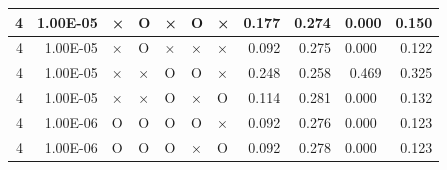 \documentclass[11pt]{article}
\begin{document}
\begin{longtable}[h]{|r|r|l|l|l|l|l|r|r|l|r|}
4                                 & 1.00E-05                         & ×                                & O                                & ×                                & O                                & ×                                 & 0.177                             & 0.274                             & 0.000                              & 0.150                               \\ \hline
4                                 & 1.00E-05                         & ×                                & O                                & ×                                & ×                                & ×                                 & 0.092                             & 0.275                             & 0.000                              & 0.122                               \\ \hline
4                                 & 1.00E-05                         & ×                                & ×                                & O                                & O                                & ×                                 & 0.248                             & 0.258                             & \multicolumn{1}{r|}{0.469}         & 0.325                               \\ \hline
4                                 & 1.00E-05                         & ×                                & ×                                & O                                & ×                                & O                                 & 0.114                             & 0.281                             & 0.000                              & 0.132                               \\ \hline
4                                 & 1.00E-06                         & O                                & O                                & O                                & O                                & ×                                 & 0.092                             & 0.276                             & 0.000                              & 0.123                               \\ \hline
4                                 & 1.00E-06                         & O                                & O                                & O                                & ×                                & O                                 & 0.092                             & 0.278                             & 0.000                              & 0.123                               \\ \hline

\end{longtable}
\end{document}
